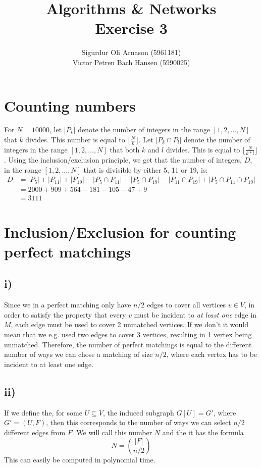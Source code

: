 \documentclass[a4paper]{article}
\author{Sigurdur Oli Arnason (5961181) \\ Victor Petren Bach Hansen (5990025)}
\title{Algorithms \& Networks \\ Exercise 3}
\begin{document}
\maketitle
\section{Counting numbers}
For $N=10000$, let $|P_k|$ denote the number of integers in the range $[1,2,\ldots,N]$ that $k$ divides. This number is equal to $\lfloor \frac{N}{k}\rfloor $. Let $|P_k \cap P_l|$ denote the number of integers in the range $[1,2,\ldots,N]$ that both $k$ and $l$ divides. This is equal to $\lfloor \frac{N}{k*l}\rfloor $. Using the inclusion/exclusion principle, we get that the number of integers, $D$, in the range $[1,2,\ldots, N]$ that is divisible by either 5, 11 or 19, is:
\begin{align*}
  D &=|P_5|+|P_{11}| + |P_{19}|-|P_{5}\cap P_{11}|-|P_{5}\cap P_{19}|-|P_{11}\cap P_{19}|+|P_{5}\cap P_{11} \cap P_{19} |\\
    &= 2000+909+564-181-105-47+9\\
    &= 3111
\end{align*}

\section{Inclusion/Exclusion for counting perfect matchings}
\subsection*{i)}
Since we in a perfect matching only have $n/2$ edges to cover all vertices $v\in V$, in order to satisfy the property that every $v$ must be incident to \textit{at least one} edge in $M$, each edge must be used to cover 2 unmatched vertices. If we don't it would mean that we e.g. used two edges to cover 3 vertices, resulting in 1 vertex being unmatched. Therefore, the number of perfect matchings is equal to the different number of ways we can chose a matching of size $n/2$, where each vertex has
to be incident to at least one edge.
\subsection*{ii)}
If we define the, for some $U \subseteq V $, the induced subgraph $G[U]=G'$, where $G'=(U,F)$, then this corresponds to the number of ways we can select $n/2$ different edges from $F$. We will call this number $N$ and the it has the formula
$$
  N=\binom{|F|}{n/2}
$$
This can easily be computed in polynomial time.
\end{document}
